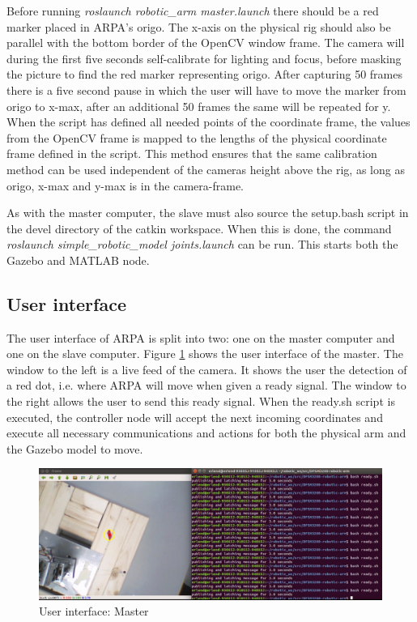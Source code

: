 \documentclass[11pt,a4paper, titlepage]{report}
\begin{document}
Before running \textit{roslaunch robotic\_arm master.launch} there should be a red marker placed in ARPA's origo. The x-axis on the physical rig should also be parallel with the bottom border of the OpenCV window frame. The camera will during the first five seconds self-calibrate for lighting and focus, before masking the picture to find the red marker representing origo. After capturing 50 frames there is a five second pause in which the user will have to move the marker from origo to x-max, after an additional 50 frames the same will be repeated for y. When the script has defined all needed points of the coordinate frame, the values from the OpenCV frame is mapped to the lengths of the physical coordinate frame defined in the script. This method ensures that the same calibration method can be used independent of the cameras height above the rig, as long as origo, x-max and y-max is in the camera-frame.
	
	As with the master computer, the slave must also source the setup.bash script in the devel directory of the catkin workspace. When this is done, the command \textit{roslaunch simple\_robotic\_model joints.launch} can be run. This starts both the Gazebo and MATLAB node.
	
	\subsection{User interface}

	The user interface of ARPA is split into two: one on the master computer and one on the slave computer. Figure \ref{fig:ui-master} shows the user interface of the master. The window to the left is a live feed of the camera. It shows the user the detection of a red dot, i.e. where ARPA will move when given a ready signal. The window to the right allows the user to send this ready signal. When the ready.sh script is executed, the controller node will accept the next incoming coordinates and execute all necessary communications and actions for both the physical arm and the Gazebo model to move.
	
	\begin{figure}[H]
		\centering
		\includegraphics[width=0.95\linewidth]{../Diagrams/UI-master.png}
		\caption{User interface: Master}
		\label{fig:ui-master}
	\end{figure}
	
\end{document}
